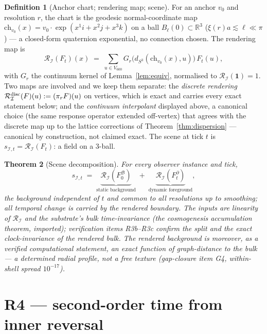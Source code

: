 \documentclass[12pt]{article}
\newtheorem{theorem}{Theorem}
\theoremstyle{definition}
\newtheorem{definition}[theorem]{Definition}
\theoremstyle{remark}
\newcommand{\Vsix}{V_{600}}
\begin{document}
\begin{definition}[Anchor chart; rendering map; scene]\label{def:scene}
For an anchor $v_0$ and resolution $r$, the chart is the geodesic normal-coordinate map $\mathrm{ch}_{v_0}(x) = v_0\cdot\exp(x^1i + x^2j + x^3k)$ on a ball $B_\ell(0)\subset\mathbb R^3$ ($\xi(r)a \lesssim \ell \ll \pi$) --- a closed-form quaternion exponential, no connection chosen. The rendering map is
$$\mathcal R_{\mathcal I}(F_t)(x) \;=\; \sum_{u\in \Vsix} G_r\bigl(d_{S^3}(\mathrm{ch}_{v_0}(x), u)\bigr)\,F_t(u),$$
with $G_r$ the continuum kernel of Lemma~\ref{lem:equiv}, normalised to $\mathcal R_{\mathcal I}(\mathbf 1) = 1$. Two maps are involved and we keep them separate: the \emph{discrete rendering} $\mathcal R^{\rm disc}_{\mathcal I}(F)(u) := (\pi_r F)(u)$ on vertices, which is exact and carries every exact statement below; and the \emph{continuum interpolant} displayed above, a canonical choice (the same response operator extended off-vertex) that agrees with the discrete map up to the lattice corrections of Theorem~\ref{thm:dispersion} --- canonical by construction, not claimed exact. The scene at tick $t$ is $s_{\mathcal I, t} = \mathcal R_{\mathcal I}(F_t)$: a field on a 3-ball.
\end{definition}

\begin{theorem}[Scene decomposition]\label{thm:scene}
For every observer instance and tick,
$$s_{\mathcal I,t} \;=\; \underbrace{\mathcal R_{\mathcal I}(F^{\mathcal B}_0)}_{\text{static background}} \;+\; \underbrace{\mathcal R_{\mathcal I}(F^\partial_t)}_{\text{dynamic foreground}},$$
the background independent of $t$ and common to all resolutions up to smoothing; all temporal change is carried by the rendered boundary. The inputs are linearity of $\mathcal R_{\mathcal I}$ and the substrate's bulk time-invariance (the cosmogenesis accumulation theorem, imported); verification items R3b--R3c confirm the split and the exact clock-invariance of the rendered bulk. The rendered background is moreover, as a verified computational statement, an exact function of graph-distance to the bulk --- a determined radial profile, not a free texture (gap-closure item G4, within-shell spread $10^{-17}$).
\end{theorem}

\section{R4 --- second-order time from inner reversal}\label{sec:time}
\end{document}
